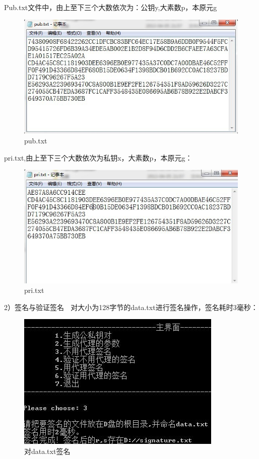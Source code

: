 Pub.txt文件中，由上至下三个大数依次为：公钥y,大素数p，本原元g

\begin{figure}[H]
\centering
\includegraphics{img/8.jpg}
\caption{pub.txt}
\end{figure}

pri.txt,由上至下三个大数依次为私钥x，大素数p，本原元g：

\begin{figure}[H]
\centering
\includegraphics{img/9.jpg}
\caption{pri.txt}
\end{figure}

2）签名与验证签名
   对大小为128字节的data.txt进行签名操作，签名耗时3毫秒：

\begin{figure}[H]
\centering
\includegraphics{img/10.jpg}
\caption{对data.txt签名}
\end{figure}

